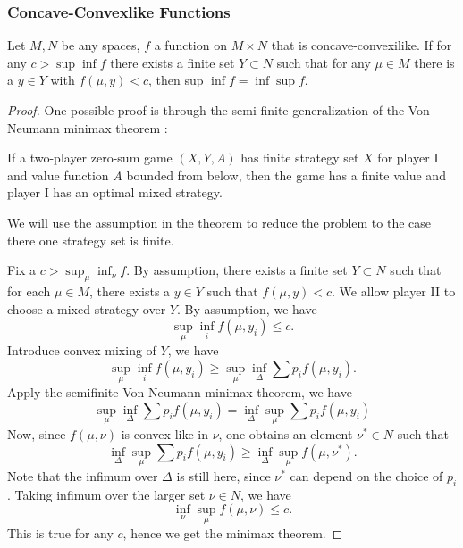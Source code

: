 \subsubsection{Concave-Convexlike Functions}

\begin{thm}
Let $M, N$ be any spaces, $f$ a function on $M \times N$ that is concave-convexilike. If for any $c>\sup \inf f$ there exists a finite set $Y \subset N$ such that for any $\mu \in M$ there is a $y \in Y$ with $f(\mu, y)<c$, then sup $\inf f=\inf \sup f$.
\end{thm}
\begin{proof}
    One possible proof is through the semi-finite generalization of the Von Neumann minimax theorem \autocite[Theorem~2.3.3, p.~46]{BlackwellGirshick1954}:

    \begin{thm}
        If a two-player zero-sum game $(X,Y,A)$ has finite strategy set $X$ for player I and value function $A$ bounded from below, then the game has a finite value and player I has an optimal mixed strategy.
    \end{thm}

    We will use the assumption in the theorem to reduce the problem to the case there one strategy set is finite. 

    Fix a $c > \sup_\mu \inf_\nu f$. By assumption, there exists a finite set $Y \subset N$ such that for each $\mu \in M$, there exists a $y \in Y$ such that $f(\mu, y) < c$. We allow player II to choose a mixed strategy over $Y$. By assumption, we have 
    \[
        \sup_\mu \inf_{i} f(\mu, y_i) \leq c.
    \]
    Introduce convex mixing of $Y$, we have
    \[
    \sup_\mu \inf_i f(\mu, y_i) \geq
    \sup_\mu \inf_{\Delta} \sum p_i f(\mu, y_i).
    \]  
    Apply the semifinite Von Neumann minimax theorem, we have
    \[
    \sup_\mu \inf_{\Delta} \sum p_i f(\mu, y_i)
    = \inf_{\Delta} \sup_\mu \sum p_i f(\mu, y_i)
    \]
    Now, since $f(\mu, \nu)$ is convex-like in $\nu$, one obtains an element $\nu^* \in N$ such that
    \[
        \inf_{\Delta} \sup_\mu \sum p_i f(\mu, y_i)
        \geq \inf_\Delta \sup_\mu f(\mu, \nu^*).
    \]
    Note that the infimum over $\Delta$ is still here, since $\nu^*$ can depend on the choice of $p_i$. Taking infimum over the larger set $\nu \in N$, we have
    \[
        \inf_\nu \sup_\mu f(\mu, \nu) \leq c.
    \]
    This is true for any $c$, hence we get the minimax theorem.
\end{proof}

